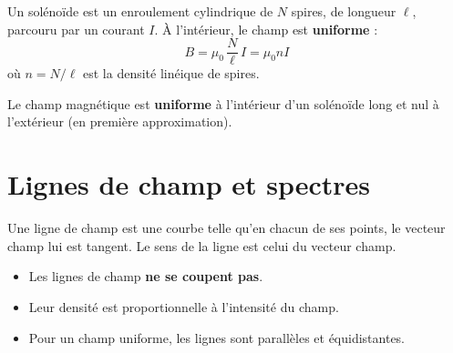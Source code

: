 \begin{definition}[Solénoïde]
Un solénoïde est un enroulement cylindrique de $N$ spires, de longueur $\ell$, parcouru par un courant $I$. À l’intérieur, le champ est \textbf{uniforme} :
\[
B = \mu_0\,\frac{N}{\ell}\,I = \mu_0 n I
\]
où $n = N/\ell$ est la densité linéique de spires.
\end{definition}

\begin{illus}
\end{illus}

\begin{aretenir}
Le champ magnétique est \textbf{uniforme} à l’intérieur d’un solénoïde long et nul à l’extérieur (en première approximation).
\end{aretenir}

\section{Lignes de champ et spectres}

\begin{definition}
Une ligne de champ est une courbe telle qu’en chacun de ses points, le vecteur champ lui est tangent. Le sens de la ligne est celui du vecteur champ.
\end{definition}

\begin{propriete}
\begin{itemize}
\item Les lignes de champ \textbf{ne se coupent pas}.
\item Leur densité est proportionnelle à l’intensité du champ.
\item Pour un champ uniforme, les lignes sont parallèles et équidistantes.
\end{itemize}
\end{propriete}


